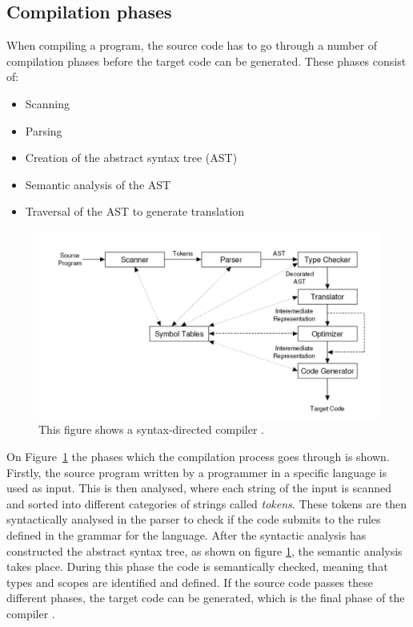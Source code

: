\subsection{Compilation phases}
When compiling a program, the source code has to go through a number of compilation phases before the target code can be generated. These phases consist of:
\begin{itemize}
    \item Scanning
    \item Parsing
    \item Creation of the abstract syntax tree (AST)
    \item Semantic analysis of the AST
    \item Traversal of the AST to generate translation
\end{itemize}
\begin{figure}[H]
\centering
  \includegraphics[scale=0.5]{figures/CompilerPhases/compilerPhases.PNG}
  \caption{This figure shows a syntax-directed compiler \cite{CraftinfACompiler}. }
  \label{fig:compilerPhases}
\end{figure}
\noindent
On Figure~\ref{fig:compilerPhases} the phases which the compilation process goes through is shown. Firstly, the source program written by a programmer in a specific language is used as input. This is then analysed, where each string of the input is scanned and sorted into different categories of strings called \textit{tokens}. These tokens are then syntactically analysed in the parser to check if the code submits to the rules defined in the grammar for the language. After the syntactic analysis has constructed the abstract syntax tree, as shown on figure \ref{fig:compilerPhases}, the semantic analysis takes place. During this phase the code is semantically checked, meaning that types and scopes are identified and defined. If the source code passes these different phases, the target code can be generated, which is the final phase of the compiler \cite{CraftinfACompiler}.
 
